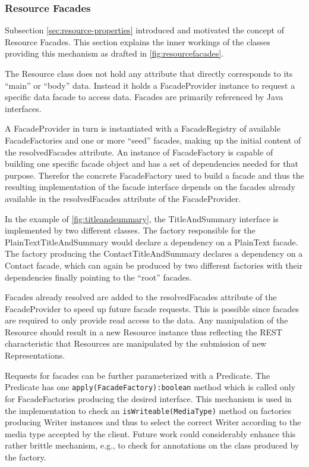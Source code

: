 \documentclass[11pt,a4paper,headsepline,twoside]{scrartcl}		%
\begin{document}
\subsubsection{Resource Facades}
\label{sec:resourcefacades}

Subsection \ref{sec:resource-properties} introduced and motivated the concept of
Resource Facades. This section explains the inner workings of the classes
providing this mechanism as drafted in \autoref{fig:resourcefacades}.

The Resource class does not hold any attribute that directly corresponds to its
``main'' or ``body'' data. Instead it holds a FacadeProvider instance to request
a specific data facade to access data. Facades are primarily referenced by Java
interfaces.

A FacadeProvider in turn is instantiated with a FacadeRegistry of available
FacadeFactories and one or more ``seed'' facades, making up the initial content
of the resolvedFacades attribute. An instance of FacadeFactory is capable of
building one specific facade object and has a set of dependencies needed for
that purpose. Therefor the concrete FacadeFactory used to build a facade and
thus the resulting implementation of the facade interface depends on the facades
already available in the resolvedFacades attribute of the FacadeProvider.

In the example of \autoref{fig:titleandsummary}, the TitleAndSummary interface
is implemented by two different classes. The factory responsible for the
PlainTextTitleAndSummary would declare a dependency on a PlainText facade. The
factory producing the ContactTitleAndSummary declares a dependency on a Contact
facade, which can again be produced by two different factories with their
dependencies finally pointing to the ``root'' facades.

Facades already resolved are added to the resolvedFacades attribute of the
FacadeProvider to speed up future facade requests. This is possible since
facades are required to only provide read access to the data. Any manipulation
of the Resource should result in a new Resource instance thus reflecting the
REST characteristic that Resources are manipulated by the submission of new
Representations.

Requests for facades can be further parameterized with a Predicate. The
Predicate has one \lstinline;apply(FacadeFactory):boolean; method which is
called only for FacadeFactories producing the desired interface. This mechanism
is used in the implementation to check an \lstinline:isWriteable(MediaType):
method on factories producing Writer instances and thus to select the correct
Writer according to the media type accepted by the client. Future work could
considerably enhance this rather brittle mechanism, e.g., to check for
annotations on the class produced by the factory.
\end{document}
